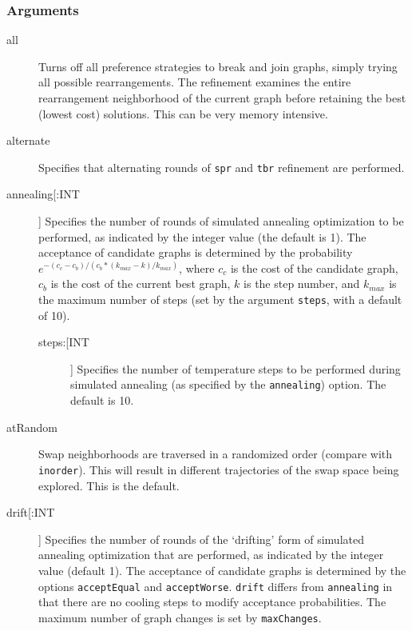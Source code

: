 	\subsubsection{Arguments}
	\begin{description}
		\item[all] Turns off all preference strategies to break and join graphs, simply trying all possible 
		rearrangements. 
		The refinement examines the entire rearrangement neighborhood of the current graph 
		before retaining the best (lowest cost) solutions. This can be very memory intensive.

		\item[alternate] Specifies that alternating rounds of \texttt{spr} \citep{Dayhoff1969} 
		and \texttt{tbr} \citep{Farris1988, swofford1990a} refinement are performed.
		
		\item[annealing[:INT]] Specifies the number of rounds of simulated annealing 
		\citep{Metropolisetal1953,Kirkpatricketal1983,Cerny1985} optimization to be performed, 
		as indicated by the integer value (the default is 1). The acceptance of candidate graphs 
		is determined by the probability $e ^ {- (c_c - c_b)/ (c_b * (k_{max} -k)/ k_{max})}$, 
		where $c_c$ is the cost of the candidate graph, $c_b$ is the cost of the current best 
		graph, $k$ is the step number, and $k_{max}$ is the maximum number of steps (set 
		by the argument \texttt{steps}, with a default of 10).
		
			\begin{description}
			\item[steps:[INT]] Specifies the number of temperature steps to be performed during 
			simulated annealing (as specified by the \texttt{annealing}) option. The default is 10.
			\end{description}
		
		\item[atRandom] Swap neighborhoods are traversed in a randomized order (compare 
		with \texttt{inorder}). 	This will result in different trajectories of the swap space being 
		explored. This is the default.
		
		\item[drift[:INT]] Specifies the number of rounds of the `drifting' form of simulated 
		annealing \citep{goloboff1999} optimization that are performed, as indicated by the integer 
		value (default 1). The acceptance of candidate graphs is determined by the options 
		\texttt{acceptEqual} and \texttt{acceptWorse}. \texttt{drift} differs from \texttt{annealing} 
		in that there are no cooling steps to modify acceptance probabilities. The maximum 
		number of graph changes is set by \texttt{maxChanges}.
			

\end{description}
